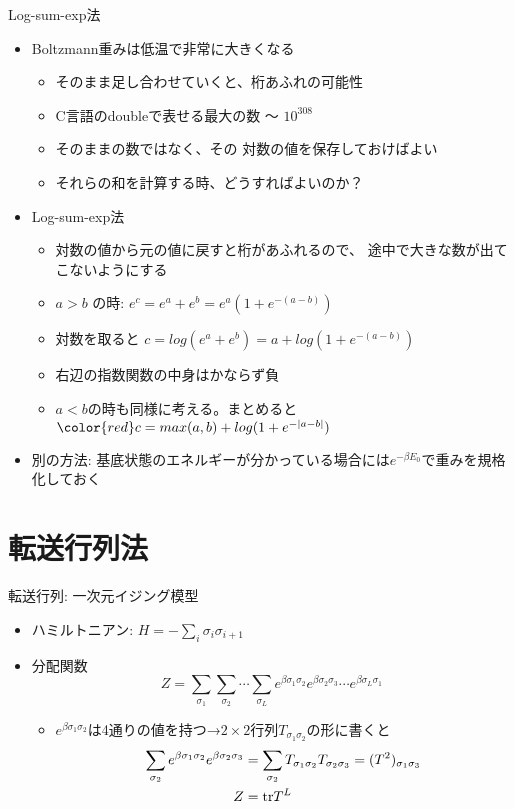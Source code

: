 \documentclass[dvipdfmx]{beamer}
\begin{document}
\begin{frame}[t,fragile]{Log-sum-exp法}
  \begin{itemize}
  \item Boltzmann重みは低温で非常に大きくなる
    \begin{itemize}
    \item そのまま足し合わせていくと、桁あふれの可能性
    \item C言語のdoubleで表せる最大の数 〜 $10^{308}$
    \item そのままの数ではなく、その{\color{red} 対数の値を保存}しておけばよい
    \item それらの和を計算する時、どうすればよいのか？
    \end{itemize}
  \item Log-sum-exp法
    \begin{itemize}
    \item 対数の値から元の値に戻すと桁があふれるので、{\color{red} 途中で大きな数が出てこないように}する
    \item $a > b$ の時: $e^c = e^a + e^b = e^a (1 + e^{-(a-b)})$
    \item 対数を取ると $c = log(e^a + e^b) = a + log(1 + e^{-(a-b)})$
    \item 右辺の指数関数の中身はかならず負
    \item $a < b$の時も同様に考える。まとめると \\
      $\color{red} c = max(a,b) + log(1 + e^{-|a-b|})$
    \end{itemize}
  \item 別の方法: 基底状態のエネルギーが分かっている場合には$e^{-\beta E_0}$で重みを規格化しておく
  \end{itemize}
\end{frame}

\section{転送行列法}

\begin{frame}[t,fragile]{転送行列: 一次元イジング模型}
  \begin{itemize}
    \setlength{\itemsep}{1em}
  \item ハミルトニアン: $H = - \sum_i \sigma_i \sigma_{i+1}$
  \item 分配関数
    \[
    Z = \sum_{\sigma_1}\sum_{\sigma_2}\cdots\sum_{\sigma_L} e^{\beta \sigma_1 \sigma_2} e^{\beta \sigma_2 \sigma_3} \cdots e^{\beta \sigma_L \sigma_1}
    \]
    \begin{itemize}
    \item $e^{\beta \sigma_1 \sigma_2}$は4通りの値を持つ→$2\times2$行列$T_{\sigma_1 \sigma_2}$の形に書くと
      \begin{align*}
      \sum_{\sigma_2} e^{\beta \sigma_1 \sigma_2} e^{\beta \sigma_2 \sigma_3} &= \sum_{\sigma_2} T_{\sigma_1 \sigma_2} T_{\sigma_2 \sigma_3} = (T^2)_{\sigma_1 \sigma_3} \\
      Z &= {\rm tr} T^L
      \end{align*}
    \end{itemize}
  \end{itemize}
\end{frame}
\end{document}
